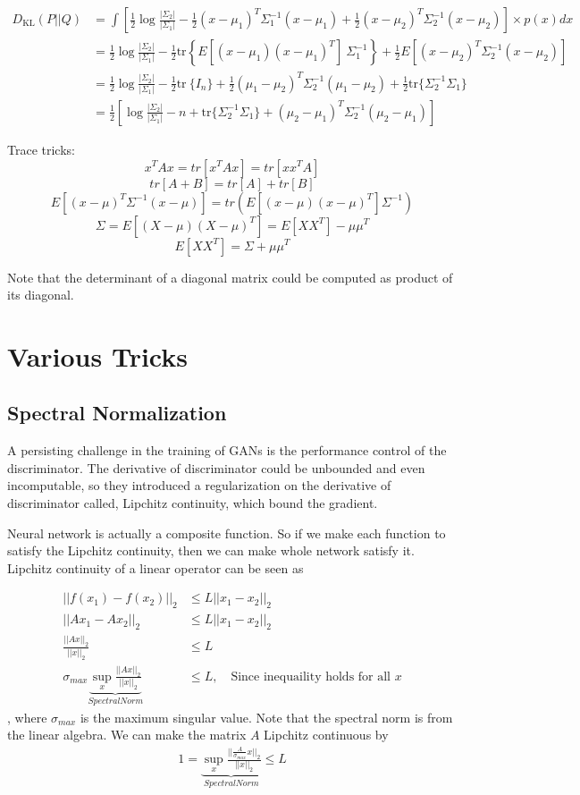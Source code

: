 \begin{appendices}
\begin{align*}
D_\text{KL}(P||Q) &= \int \left[ \frac{1}{2} \log\frac{|\Sigma_2|}{|\Sigma_1|} - \frac{1}{2} (x-\mu_1)^T\Sigma_1^{-1}(x-\mu_1) + \frac{1}{2} (x-\mu_2)^T\Sigma_2^{-1}(x-\mu_2) \right] \times p(x) dx \\
&= \frac{1}{2} \log\frac{|\Sigma_2|}{|\Sigma_1|} - \frac{1}{2} \text{tr} \left\{E[(x - \mu_1)(x - \mu_1)^T] \ \Sigma_1^{-1} \right\} + \frac{1}{2} E[(x - \mu_2)^T \Sigma_2^{-1} (x - \mu_2)] \\
&= \frac{1}{2} \log\frac{|\Sigma_2|}{|\Sigma_1|} - \frac{1}{2} \text{tr}\ \{I_n \} + \frac{1}{2} (\mu_1 - \mu_2)^T \Sigma_2^{-1} (\mu_1 - \mu_2) + \frac{1}{2} \text{tr} \{ \Sigma_2^{-1} \Sigma_1 \} \\
&= \frac{1}{2}\left[\log\frac{|\Sigma_2|}{|\Sigma_1|} - n + \text{tr} \{ \Sigma_2^{-1}\Sigma_1 \} + (\mu_2 - \mu_1)^T \Sigma_2^{-1}(\mu_2 - \mu_1)\right]
\end{align*}

Trace tricks:
$$x^TAx = tr[x^TAx] = tr[xx^TA]$$
$$tr[A+B] = tr[A]+tr[B]$$
$$E[(x-\mu)^T \Sigma^{-1} (x-\mu)]= tr(E[(x-\mu)(x-\mu)^T] \Sigma^{-1})$$
$$\Sigma = E[(X-\mu)(X-\mu)^T]=E[XX^T]-\mu\mu^T$$
$$E[XX^T] = \Sigma + \mu\mu^T$$

Note that the determinant of a diagonal matrix could be computed as product of its diagonal.


\section{Various Tricks}

\subsection{Spectral Normalization}

A persisting challenge in the training of GANs is the performance control of the discriminator. The derivative of discriminator could be unbounded and even incomputable, so they introduced a regularization on the derivative of discriminator called, Lipchitz continuity, which bound the gradient.

Neural network is actually a composite function. So if we make each function to satisfy the Lipchitz continuity, then we can make whole network satisfy it. Lipchitz continuity of a linear operator can be seen as 

\begin{align*}
	||f(x_1)-f(x_2)||_2 &\leq L||x_1-x_2||_2\\
	||Ax_1-Ax_2||_2 &\leq L||x_1-x_2||_2\\
	\frac{||Ax||_2}{||x||_2}&\leq L\\
	\sigma_{max}\underbrace{\sup_x \frac{||Ax||_2}{||x||_2}}_{Spectral Norm}&\leq L, \quad \textrm{Since inequaility holds for all }x
\end{align*}
, where $\sigma_{max}$ is the maximum singular value. Note that the spectral norm is from the linear algebra. We can make the matrix $A$ Lipchitz continuous by 
\begin{align*}
1 = \underbrace{\sup_x \frac{||\frac{A}{\sigma_{max}}x||_2}{||x||_2}}_{Spectral Norm}\leq L
\end{align*}



\end{appendices}
